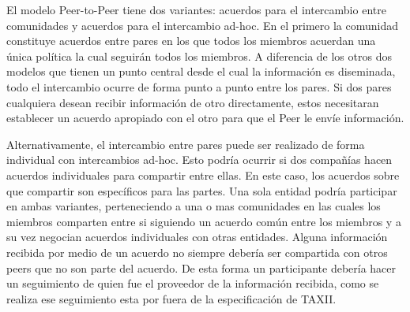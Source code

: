 El modelo Peer-to-Peer tiene dos variantes: acuerdos para el intercambio entre 
comunidades y acuerdos para el intercambio ad-hoc. En el primero la comunidad 
constituye acuerdos entre pares en los que todos los miembros acuerdan una única 
política la cual seguirán todos los miembros. A diferencia de los otros dos 
modelos que tienen un punto central desde el cual la información es diseminada, 
todo el intercambio ocurre de forma punto a punto entre los pares. Si dos pares 
cualquiera desean recibir información de otro directamente, estos necesitaran 
establecer un acuerdo apropiado con el otro para que el Peer le envíe 
información.

Alternativamente, el intercambio entre pares puede ser realizado de forma 
individual con intercambios ad-hoc. Esto podría ocurrir si dos compañías hacen 
acuerdos individuales para compartir entre ellas. En este caso, los acuerdos 
sobre que compartir son específicos para las partes. Una sola entidad podría 
participar en ambas variantes, perteneciendo a una o mas comunidades en las 
cuales los miembros comparten entre si siguiendo un acuerdo común entre los 
miembros y a su vez negocian acuerdos individuales con otras entidades. Alguna 
información recibida por medio de un acuerdo no siempre debería ser compartida 
con otros peers que no son parte del acuerdo. De esta forma un participante 
debería hacer un seguimiento de quien fue el proveedor de la información 
recibida, como se realiza ese seguimiento esta por fuera de la especificación de 
TAXII.

